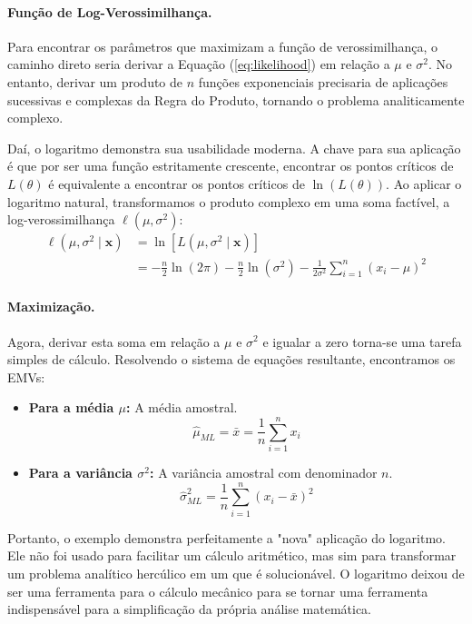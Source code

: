\paragraph{Função de Log-Verossimilhança.}
Para encontrar os parâmetros que maximizam a função de verossimilhança, o caminho direto seria derivar a Equação (\ref{eq:likelihood}) em relação a $\mu$ e $\sigma^2$. No entanto, derivar um produto de $n$ funções exponenciais precisaria de aplicações sucessivas e complexas da Regra do Produto, tornando o problema analiticamente complexo.

Daí, o logaritmo demonstra sua usabilidade moderna. A chave para sua aplicação é que por ser uma função estritamente crescente, encontrar os pontos críticos de $L(\theta)$ é equivalente a encontrar os pontos críticos de $\ln(L(\theta))$. Ao aplicar o logaritmo natural, transformamos o produto complexo em uma soma factível, a log-verossimilhança $\ell(\mu, \sigma^2)$:
\begin{align*}
    \ell(\mu, \sigma^2 \mid \mathbf{x}) &= \ln\left[ L(\mu, \sigma^2 \mid \mathbf{x}) \right] \\
    &= -\frac{n}{2} \ln(2\pi) - \frac{n}{2} \ln(\sigma^2) - \frac{1}{2\sigma^2} \sum_{i=1}^{n} (x_i-\mu)^2
\end{align*}

\paragraph{Maximização.}
Agora, derivar esta soma em relação a $\mu$ e $\sigma^2$ e igualar a zero torna-se uma tarefa simples de cálculo. Resolvendo o sistema de equações resultante, encontramos os EMVs:
\begin{itemize}
    \item \textbf{Para a média $\mu$:} A média amostral.
          \[ \hat{\mu}_{ML} = \bar{x} = \frac{1}{n}\sum_{i=1}^{n} x_i \]
    \item \textbf{Para a variância $\sigma^2$:} A variância amostral com denominador $n$.
          \[ \hat{\sigma}^2_{ML} = \frac{1}{n}\sum_{i=1}^{n} (x_i-\bar{x})^2 \]
\end{itemize}

Portanto, o exemplo demonstra perfeitamente a "nova" aplicação do logaritmo. Ele não foi usado para facilitar um cálculo aritmético, mas sim para transformar um problema analítico hercúlico em um que é solucionável. O logaritmo deixou de ser uma ferramenta para o cálculo mecânico para se tornar uma ferramenta indispensável para a simplificação da própria análise matemática.